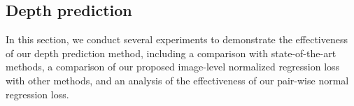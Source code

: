 \begin{table}[t]
\small
\centering
\begin{threeparttable}
\end{threeparttable}
\vspace{0.4em}
\caption{Quantitative comparison of the quality of depth boundaries (DBE) and planes (PE) on the iBims-1 dataset. We use  to indicate when a method was trained on the small training subset.\label{Tab: cmp of edges and planes}}
\vspace{-2em}
\end{table}

\subsection{Depth prediction}
In this section, we conduct several experiments to demonstrate the effectiveness of our depth prediction method, including a comparison with state-of-the-art methods, a comparison of our proposed image-level normalized regression loss with other methods, and an analysis of the effectiveness of our pair-wise normal regression loss. 

